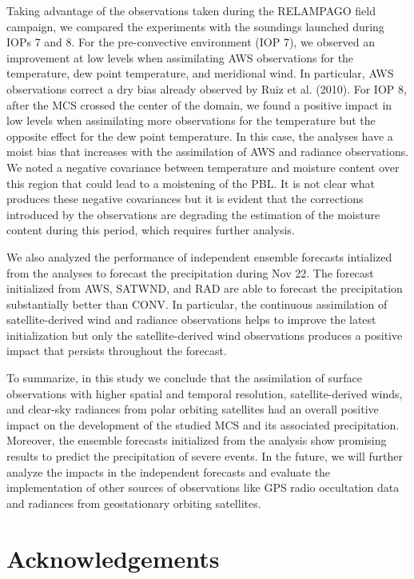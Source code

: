 \documentclass[final,5p,times,twocolumn,authoryear]{elsarticle} %
\begin{document}
Taking advantage of the observations taken during the RELAMPAGO field campaign, we compared the experiments with the soundings launched during IOPs 7 and 8. For the pre-convective environment (IOP 7), we observed an improvement at low levels when assimilating AWS observations for the temperature, dew point temperature, and meridional wind. In particular, AWS observations correct a dry bias already observed by Ruiz et al. (2010). For IOP 8, after the MCS crossed the center of the domain, we found a positive impact in low levels when assimilating more observations for the temperature but the opposite effect for the dew point temperature. In this case, the analyses have a moist bias that increases with the assimilation of AWS and radiance observations. We noted a negative covariance between temperature and moisture content over this region that could lead to a moistening of the PBL. It is not clear what produces these negative covariances but it is evident that the corrections introduced by the observations are degrading the estimation of the moisture content during this period, which requires further analysis.

We also analyzed the performance of independent ensemble forecasts intialized from the analyses to forecast the precipitation during Nov 22. The forecast initialized from AWS, SATWND, and RAD are able to forecast the precipitation substantially better than CONV. In particular, the continuous assimilation of satellite-derived wind and radiance observations helps to improve the latest initialization but only the satellite-derived wind observations produces a positive impact that persists throughout the forecast.

To summarize, in this study we conclude that the assimilation of surface observations with higher spatial and temporal resolution, satellite-derived winds, and clear-sky radiances from polar orbiting satellites had an overall positive impact on the development of the studied MCS and its associated precipitation. Moreover, the ensemble forecasts initialized from the analysis show promising results to predict the precipitation of severe events. In the future, we will further analyze the impacts in the independent forecasts and evaluate the implementation of other sources of observations like GPS radio occultation data and radiances from geostationary orbiting satellites.

\hypertarget{acknowledgements}{%
\section{Acknowledgements}\label{acknowledgements}}
\end{document}
